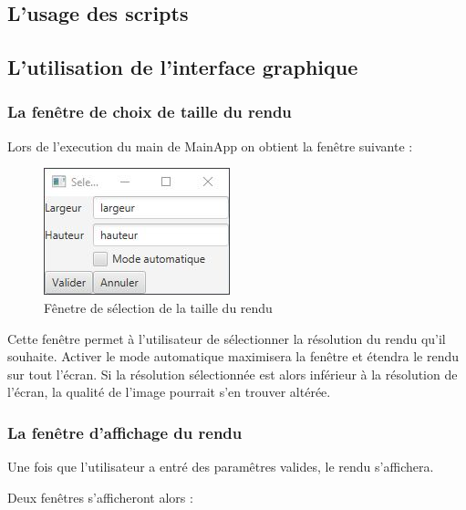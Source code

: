 \subsection{L'usage des scripts}

\subsection{L'utilisation de l'interface graphique}

\subsubsection{La fenêtre de choix de taille du rendu}

Lors de l'execution du main de MainApp on obtient la fenêtre suivante :
\begin{figure}[h]
   \caption{Fênetre de sélection de la taille du rendu}
   \begin{center}
       \includegraphics{img/render.javafx/choiceWindow.jpg}
   \end{center}
\end{figure}

Cette fenêtre permet à l'utilisateur de sélectionner la résolution du rendu qu'il souhaite.
Activer le mode automatique maximisera la fenêtre et étendra le rendu sur tout l'écran. Si la résolution sélectionnée est alors inférieur à la résolution de l'écran, la qualité de l'image pourrait s'en trouver altérée.

\subsubsection{La fenêtre d'affichage du rendu}

Une fois que l'utilisateur a entré des paramêtres valides, le rendu s'affichera.

Deux fenêtres s'afficheront alors :

